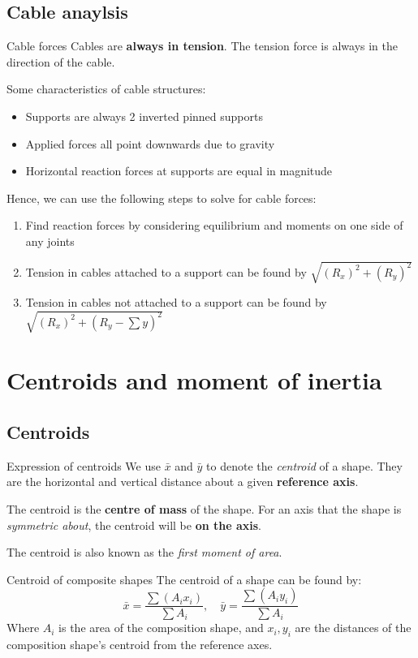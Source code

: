 \documentclass{article}
\begin{document}
\subsection{Cable anaylsis}
\begin{definition}
    {Cable forces}
    Cables are \textbf{always in tension}. The tension force is always in the direction of the cable.
\end{definition}
Some characteristics of cable structures:
\begin{itemize}
    \item Supports are always 2 inverted pinned supports
    \item Applied forces all point downwards due to gravity
    \item Horizontal reaction forces at supports are equal in magnitude
\end{itemize}
Hence, we can use the following steps to solve for cable forces:
\begin{enumerate}
    \item Find reaction forces by considering equilibrium and moments on one side of any joints
    \item Tension in cables attached to a support can be found by $\sqrt{(R_x)^2+(R_y)^2}$
    \item Tension in cables not attached to a support can be found by $\sqrt{(R_x)^2+(R_y-\sum y)^2}$
\end{enumerate}


\section{Centroids and moment of inertia}

\subsection{Centroids}
\begin{knBox}
    {Expression of centroids}
    We use $\bar{x}$ and $\bar{y}$ to denote the \emph{centroid} of a shape. They are the horizontal and vertical distance about a given \textbf{reference axis}.

    The centroid is the \textbf{centre of mass} of the shape. For an axis that the shape is \emph{symmetric about}, the centroid will be \textbf{on the axis}.

    The centroid is also known as the \emph{first moment of area}.
\end{knBox}
\begin{definition}
    {Centroid of composite shapes}
    The centroid of a shape can be found by:
    \[\bar{x}=\frac{\sum (A_i x_i)}{\sum A_i},\quad \bar{y}=\frac{\sum (A_i y_i)}{\sum A_i}\]
    Where $A_i$ is the area of the composition shape, and $x_i, y_i$ are the distances of the composition shape's centroid from the reference axes.
\end{definition}
\end{document}
